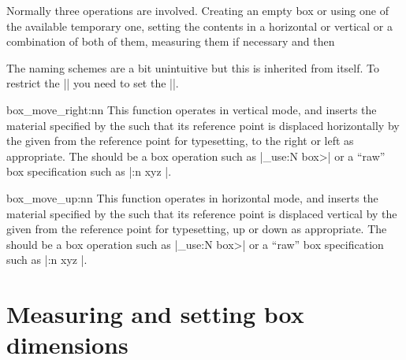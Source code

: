 Normally three operations are involved. Creating an empty box or using one of the available temporary one, setting the contents in a horizontal or vertical or a combination of both of them, measuring them if necessary 
and then 


The naming schemes are a bit unintuitive but this is inherited from \tex itself. To restrict the |\vbox| you need to set the |\hsize|.  

 \begin{docCommand}{box_move_right:nn}{  }
 This function operates in vertical mode, and inserts the
  material specified by the 
  such that its reference point is displaced horizontally by the given
    from the reference point for typesetting, to the right
   or left as appropriate. The  should be
   a box operation such as |\box_use:N \<box>| or a \enquote{raw}
   box specification such as |\vbox:n { xyz }|.
 \end{docCommand}

 \begin{docCommand}{box_move_up:nn}{  }
   This function operates in horizontal mode, and inserts the
   material specified by the 
   such that its reference point is displaced vertical by the given
    from the reference point for typesetting, up
   or down as appropriate. The  should be
   a box operation such as |\box_use:N \<box>| or a \enquote{raw}
   box specification such as |\vbox:n { xyz }|.
 \end{docCommand}
 

 \section{Measuring and setting box dimensions}

